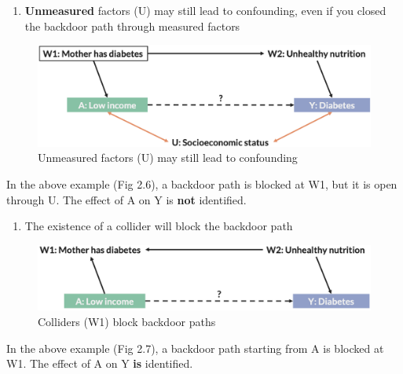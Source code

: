\documentclass[
]{book}
\providecommand{\tightlist}{%
  \setlength{\itemsep}{0pt}\setlength{\parskip}{0pt}}
\begin{document}
\begin{enumerate}
\def\labelenumi{\arabic{enumi}.}
\setcounter{enumi}{2}
\tightlist
\item
  \textbf{Unmeasured} factors (U) may still lead to confounding, even if you closed the backdoor path through measured factors
\end{enumerate}

\begin{figure}

{\centering \includegraphics[width=1\linewidth]{img/confounding/dag_rules_3} 

}

\caption{Unmeasured factors (U) may still lead to confounding}\label{fig:unnamed-chunk-8}
\end{figure}

In the above example (Fig 2.6), a backdoor path is blocked at W1, but it is open through U. The effect of A on Y is \textbf{not} identified.

\begin{enumerate}
\def\labelenumi{\arabic{enumi}.}
\setcounter{enumi}{3}
\tightlist
\item
  The existence of a collider will block the backdoor path
\end{enumerate}

\begin{figure}

{\centering \includegraphics[width=1\linewidth]{img/confounding/dag_rules_4} 

}

\caption{Colliders (W1) block backdoor paths}\label{fig:unnamed-chunk-9}
\end{figure}

In the above example (Fig 2.7), a backdoor path starting from A is blocked at W1. The effect of A on Y \textbf{is} identified.
\end{document}
